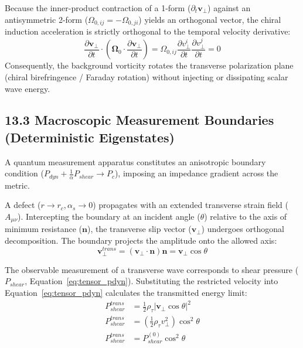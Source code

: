 Because the inner-product contraction of a 1-form ($\partial_t \mathbf{v}_\perp$) against an antisymmetric 2-form ($\Omega_{0,ij} = -\Omega_{0,ji}$) yields an orthogonal vector, the chiral induction acceleration is strictly orthogonal to the temporal velocity derivative: 
\begin{equation}
    \frac{\partial \mathbf{v}_\perp}{\partial t} \cdot \left( \boldsymbol{\Omega}_0 \cdot \frac{\partial \mathbf{v}_\perp}{\partial t} \right) = \Omega_{0,ij} \frac{\partial v_\perp^i}{\partial t}\frac{\partial v_\perp^j}{\partial t} = 0 %
\end{equation}
Consequently, the background vorticity rotates the transverse polarization plane (chiral birefringence / Faraday rotation) without injecting or dissipating scalar wave energy.

\subsection*{13.3 Macroscopic Measurement Boundaries (Deterministic Eigenstates)} 
A quantum measurement apparatus constitutes an anisotropic boundary condition ($P_{dyn} + \frac{1}{\alpha}P_{shear} \to P_c$), imposing an impedance gradient across the metric. %

A defect ($r \to r_c, \alpha_s \to 0$) propagates with an extended transverse strain field ($A_{\mu\nu}$). Intercepting the boundary at an incident angle ($\theta$) relative to the axis of minimum resistance ($\mathbf{n}$), the transverse slip vector ($\mathbf{v}_\perp$) undergoes orthogonal decomposition. The boundary projects the amplitude onto the allowed axis: 
\begin{equation}
    \mathbf{v}_\perp^{trans} = (\mathbf{v}_\perp \cdot \mathbf{n})\mathbf{n} = \mathbf{v}_\perp \cos\theta
\end{equation}

The observable measurement of a transverse wave corresponds to shear pressure ($P_{shear}$, Equation~\ref{eq:tensor_pdyn}). Substituting the restricted velocity into Equation~\ref{eq:tensor_pdyn} calculates the transmitted energy limit: %
\begin{align}
    P_{shear}^{trans} &= \frac{1}{2} \rho_\tau |\mathbf{v}_\perp \cos\theta|^2 \nonumber \\ %
    P_{shear}^{trans} &= \left( \frac{1}{2} \rho_\tau v_\perp^2 \right) \cos^2\theta \nonumber \\ %
    P_{shear}^{trans} &= P_{shear}^{(0)} \cos^2\theta %
\end{align}

